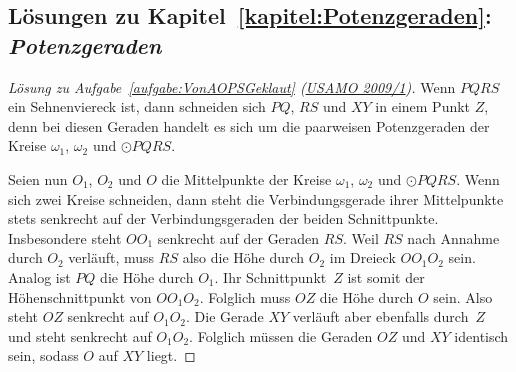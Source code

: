 \subsection*{Lösungen zu Kapitel~\ref{kapitel:Potenzgeraden}: \emph{Potenzgeraden}}
\begin{proof}[Lösung zu Aufgabe~\ref{aufgabe:VonAOPSGeklaut} \textmd{(\href{https://artofproblemsolving.com/community/c4507_2009_usamo}{USAMO 2009/1})}]
	Wenn $PQRS$ ein Sehnenviereck ist, dann schneiden sich $PQ$, $RS$ und $XY$ in einem Punkt $Z$, denn bei diesen Geraden handelt es sich um die paarweisen Potenzgeraden der Kreise $\omega_1$, $\omega_2$ und $\odot PQRS$.
	
	Seien nun $O_1$, $O_2$ und $O$ die Mittelpunkte der Kreise $\omega_1$, $\omega_2$ und $\odot PQRS$. Wenn sich zwei Kreise schneiden, dann steht die Verbindungsgerade ihrer Mittelpunkte stets senkrecht auf der Verbindungsgeraden der beiden Schnittpunkte. Insbesondere steht $OO_1$ senkrecht auf der Geraden $RS$. Weil $RS$ nach Annahme durch $O_2$ verläuft, muss $RS$ also die Höhe durch $O_2$ im Dreieck $OO_1O_2$ sein. Analog ist $PQ$ die Höhe durch $O_1$. Ihr Schnittpunkt~$Z$ ist somit der Höhenschnittpunkt von $OO_1O_2$. Folglich muss $OZ$ die Höhe durch $O$ sein. Also steht $OZ$ senkrecht auf $O_1O_2$. Die Gerade $XY$ verläuft aber ebenfalls durch~$Z$ und steht senkrecht auf $O_1O_2$. Folglich müssen die Geraden $OZ$ und $XY$ identisch sein, sodass $O$ auf $XY$ liegt.
\end{proof}

